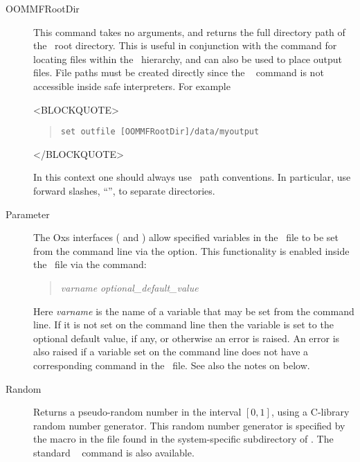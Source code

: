 \begin{description}
\item[OOMMFRootDir\label{html:mif2oommfrootdir}]
This command takes no arguments, and returns the full directory path of
the \OOMMF\ root directory.  This is useful in conjunction with the
 command for locating files within the \OOMMF\ hierarchy,
and can also be used to place output files.  File paths must be created
directly since the \Tcl\  command is not accessible inside safe
interpreters.  For example
\begin{rawhtml}<BLOCKQUOTE>\end{rawhtml}
\begin{quote}
\begin{verbatim}
set outfile [OOMMFRootDir]/data/myoutput
\end{verbatim}
\end{quote}
\begin{rawhtml}</BLOCKQUOTE>\end{rawhtml}
In this context one should always use \Tcl\ path conventions.  In
particular, use forward slashes, ``\fs'', to separate directories.

\item[Parameter\label{html:mif2parameter}]
The Oxs interfaces
( and
)
allow specified variables in the \MIF\ file to be set from the command
line via the  option.  This functionality is enabled
inside the \MIF\ file via the  command:
\begin{quote}
 \textit{varname} \textit{optional\_default\_value}
\end{quote}
Here \textit{varname} is the name of a variable that may be set from
the command line.  If it is not set on the command line then the
variable is set to the optional default value, if any, or otherwise an
error is raised.  An error is also raised if a variable set on the
command line does not have a corresponding  command in the
\MIF\ file.  See also the notes on
 below.

\item[Random\label{html:mif2Random}]
Returns a pseudo-random number in the interval $[0,1]$, using a
C-library random number generator.  This random number generator is
specified by the  macro in the  file found in
the system-specific subdirectory of .  The standard
\Tcl\  command is also available.


\end{description}
